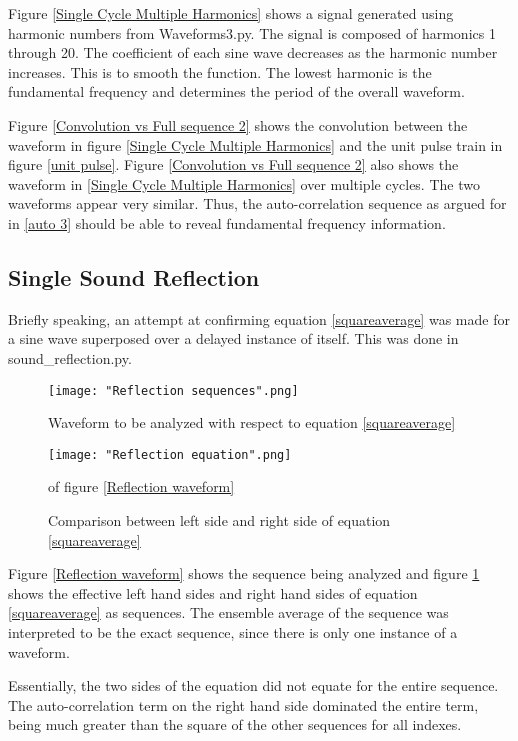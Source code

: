 \documentclass[12pt]{article}
\begin{document}
Figure \ref{Single Cycle Multiple Harmonics} shows a signal generated using harmonic numbers from Waveforms3.py. The signal is composed of harmonics 1 through 20. The coefficient of each sine wave decreases as the harmonic number increases. This is to smooth the function. The lowest harmonic is the fundamental frequency and determines the period of the overall waveform.\newline

Figure \ref{Convolution vs Full sequence 2} shows the convolution between the waveform in figure \ref{Single Cycle Multiple Harmonics} and the unit pulse train in figure \ref{unit pulse}. Figure \ref{Convolution vs Full sequence 2} also shows the waveform in \ref{Single Cycle Multiple Harmonics} over multiple cycles. The two waveforms appear very similar. Thus, the auto-correlation sequence as argued for in \ref{auto 3} should be able to reveal fundamental frequency information.

\subsection{Single Sound Reflection}

Briefly speaking, an attempt at confirming equation \ref{squareaverage} was made for a sine wave superposed over a delayed instance of itself. This was done in sound\_reflection.py.

\begin{figure}[H]
    \texttt{[image: "Reflection sequences".png]}
    \caption{Waveform to be analyzed with respect to equation \ref{squareaverage}}\label{Reflection waveform}
    \endminipage\hfill
    \texttt{[image: "Reflection equation".png]}
    \caption{Comparison between left side and right side of equation \ref{squareaverage}} of figure \ref{Reflection waveform}\label{Reflection equation}
    \endminipage\hfill
\end{figure}

Figure \ref{Reflection waveform} shows the sequence being analyzed and figure \ref{Reflection equation} shows the effective left hand sides and right hand sides of equation \ref{squareaverage} as sequences. The ensemble average of the sequence was interpreted to be the exact sequence, since there is only one instance of a waveform.

Essentially, the two sides of the equation did not equate for the entire sequence. The auto-correlation term on the right hand side dominated the entire term, being much greater than the square of the other sequences for all indexes.
\end{document}
